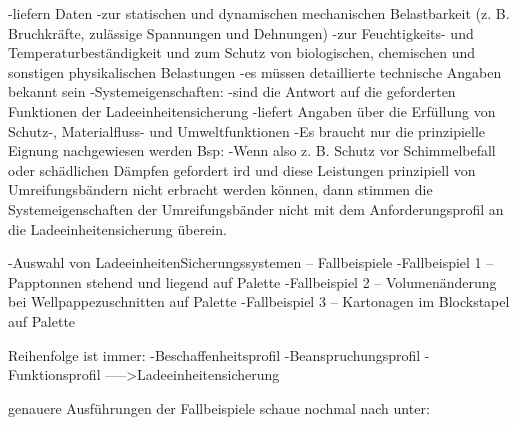                        -liefern Daten 
                            -zur statischen und dynamischen mechanischen Belastbarkeit (z. B. Bruchkräfte, zulässige Spannungen und Dehnungen)
                            -zur Feuchtigkeits- und Temperaturbeständigkeit und zum Schutz von biologischen, chemischen und sonstigen physikalischen Belastungen
                            -es müssen detaillierte technische Angaben bekannt sein
                    -Systemeigenschaften: 
                        -sind die Antwort auf die geforderten Funktionen der Ladeeinheitensicherung
                        -liefert Angaben über die Erfüllung von Schutz-, Materialfluss- und Umweltfunktionen
                        -Es braucht nur die prinzipielle Eignung nachgewiesen werden
                    Bsp: 
                        -Wenn also z. B. Schutz vor Schimmelbefall oder schädlichen Dämpfen gefordert  ird und diese Leistungen prinzipiell von Umreifungsbändern nicht erbracht werden können, dann stimmen die Systemeigenschaften der Umreifungsbänder nicht mit dem Anforderungsprofil an die Ladeeinheitensicherung überein.
                        
    -Auswahl von LadeeinheitenSicherungssystemen – Fallbeispiele
        -Fallbeispiel 1 – Papptonnen stehend und liegend auf Palette 
        -Fallbeispiel 2 – Volumenänderung bei Wellpappezuschnitten auf Palette
        -Fallbeispiel 3 – Kartonagen im Blockstapel auf Palette
        
        Reihenfolge ist immer:
            -Beschaffenheitsprofil
            -Beanspruchungsprofil
            -Funktionsprofil
            ----->Ladeeinheitensicherung
        
        genauere Ausführungen der Fallbeispiele schaue nochmal nach unter:
    
                
    